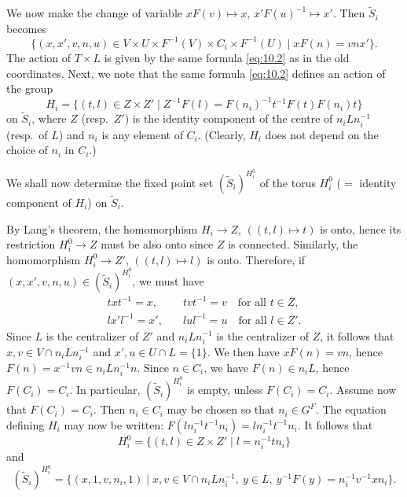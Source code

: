 \documentclass[12pt,a4paper]{article}
\theoremstyle{plain}
\theoremstyle{remark}
\begin{document}
We now make the change of variable $xF(v) \mapsto x$, $x'F(u)^{-1} \mapsto x'$. Then $\tilde{S}_i$ becomes
\begin{equation*}
\{(x,x',v,n,u) \in V \times U \times F^{-1}(V) \times C_i \times F^{-1}(U) \mid xF(n) = vnx'\}.
\end{equation*}
The action of $T \times L$ is given by the same formula \eqref{eq:10.2} as in the old coordinates. Next, we note that the same formula \eqref{eq:10.2} defines an action of the group
\begin{equation*}
H_i = \{(t,l) \in Z \times Z' \mid Z^{-1}F(l) = F(n_i)^{-1} t^{-1}F(t) F(n_i) t\}
\end{equation*}
on $\tilde{S}_i$, where $Z$ (resp.\ $Z'$) is the identity component of the centre of $n_iLn_i^{-1}$ (resp.\ of $L$) and $n_i$ is any element of $C_i$. (Clearly, $H_i$ does not depend on the choice of $n_i$ in $C_i$.)

We shall now determine the fixed point set $(\tilde{S}_i)^{H_i^0}$ of the torus $H_i^0$ ($=$ identity component of $H_i$) on $\tilde{S}_i$.

By Lang's theorem, the homomorphism $H_i \to Z$, $((t,l) \mapsto t)$ is onto, hence its restriction $H_i^0 \to Z$ must be also onto since $Z$ is connected. Similarly, the homomorphism $H_i^0 \to Z'$, $((t,l) \mapsto l)$ is onto. Therefore, if $(x,x',v,n,u) \in (\tilde{S}_i)^{H_i^0}$, we must have
\begin{align*}
txt^{-1} = x, \quad &tvt^{-1} = v \quad \text{for all } t \in Z, \\
lx'l^{-1} = x', \quad &lul^{-1} = u \quad \text{for all } l \in Z'.
\end{align*}
Since $L$ is the centralizer of $Z'$ and $n_iLn_i^{-1}$ is the centralizer of $Z$, it follows that $x, v \in V \cap n_iLn_i^{-1}$ and $x', u \in U \cap L = \{1\}$. We then have $xF(n) = vn$, hence $F(n) = x^{-1}vn \in n_iLn_i^{-1}n$. Since $n \in C_i$, we have $F(n) \in n_iL$, hence $F(C_i) = C_i$. In particular, $(\tilde{S}_i)^{H_i^0}$ is empty, unless $F(C_i) = C_i$. Assume now that $F(C_i) = C_i$. Then $n_i \in C_i$ may be chosen so that $n_i \in G^{F}$. The equation defining $H_i$ may now be written: $F(ln_i^{-1}t^{-1}n_i) = ln_i^{-1}t^{-1}n_i$. It follows that
\begin{equation*}
H_i^0 = \{(t,l) \in Z \times Z' \mid l = n_i^{-1}tn_i\}
\end{equation*}
and
\begin{equation*}
(\tilde{S}_i)^{H_i^0} = \{(x,1,v,n_i,1) \mid x, v \in V \cap n_iLn_i^{-1},\ y \in L,\ y^{-1}F(y) = n_i^{-1}v^{-1}xn_i\}.
\end{equation*}
\end{document}
